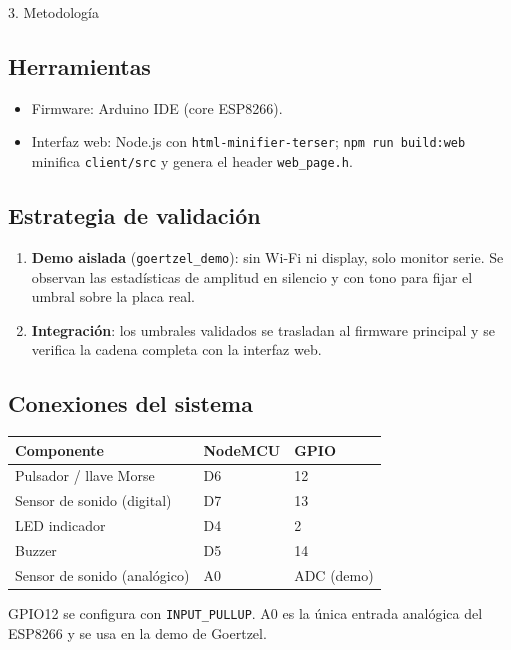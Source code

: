 \documentclass[final]{beamer}
\newlength{\onecolwid}
\newlength{\twocolwid}
\begin{document}
\begin{frame}[t]
\begin{columns}[t]
\begin{column}{\twocolwid}
\begin{columns}[t,totalwidth=\twocolwid]
\begin{column}{\onecolwid}
\begin{block}{3. Metodología}
\subsection*{Herramientas}
\begin{itemize}
\item Firmware: Arduino IDE (core ESP8266).
\item Interfaz web: Node.js con \texttt{html-minifier-terser}; \texttt{npm run build:web} minifica \texttt{client/src} y genera el header \texttt{web\_page.h}.
\end{itemize}

\subsection*{Estrategia de validación}
\begin{enumerate}
\item \textbf{Demo aislada} (\texttt{goertzel\_demo}): sin Wi-Fi ni display, solo monitor serie. Se observan las estadísticas de amplitud en silencio y con tono para fijar el umbral sobre la placa real.
\item \textbf{Integración}: los umbrales validados se trasladan al firmware principal y se verifica la cadena completa con la interfaz web.
\end{enumerate}

\subsection*{Conexiones del sistema}
{\small
\begin{tabular}{l l l}
\toprule
\textbf{Componente} & \textbf{NodeMCU} & \textbf{GPIO}\\
\midrule
Pulsador / llave Morse & D6 & 12\\
Sensor de sonido (digital) & D7 & 13\\
LED indicador & D4 & 2\\
Buzzer & D5 & 14\\
Sensor de sonido (analógico) & A0 & ADC (demo)\\
\bottomrule
\end{tabular}
}

GPIO12 se configura con \texttt{INPUT\_PULLUP}. A0 es la única entrada analógica del ESP8266 y se usa en la demo de Goertzel.

\end{block}



\end{column}
\end{columns}
\end{column}
\end{columns}
\end{frame}
\end{document}
